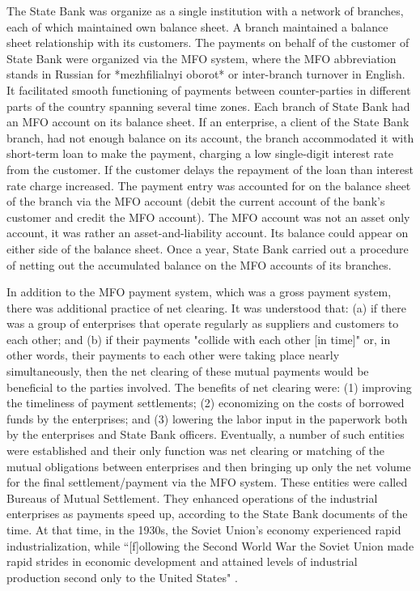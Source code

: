 The State Bank was organize as a single institution with a network of
branches, each of which maintained own balance sheet. A branch
maintained a balance sheet relationship with its customers. The payments
on behalf of the customer of State Bank were organized via the MFO
system, where the MFO abbreviation stands in Russian for *mezhfilialnyi
oborot* or inter-branch turnover in English. It facilitated smooth
functioning of payments between counter-parties in different parts of
the country spanning several time zones. Each branch of State Bank had
an MFO account on its balance sheet. If an enterprise, a client of the
State Bank branch, had not enough balance on its account, the branch
accommodated it with short-term loan to make the payment, charging a low
single-digit interest rate from the customer. If the customer delays the
repayment of the loan than interest rate charge increased. The payment
entry was accounted for on the balance sheet of the branch via the MFO
account (debit the current account of the bank's customer and credit the
MFO account). The MFO account was not an asset only account, it was
rather an asset-and-liability account. Its balance could appear on
either side of the balance sheet. Once a year, State Bank carried out a
procedure of netting out the accumulated balance on the MFO accounts of
its branches.

In addition to the MFO payment system, which was a gross payment system,
there was additional practice of net clearing. It was understood that:
(a) if there was a group of enterprises that operate regularly as
suppliers and customers to each other; and (b) if their payments
"collide with each other [in time]" or, in other words, their payments
to each other were taking place nearly simultaneously, then the net
clearing of these mutual payments would be beneficial to the parties
involved. The benefits of net clearing were: (1) improving the
timeliness of payment settlements; (2) economizing on the costs of
borrowed funds by the enterprises; and (3) lowering the labor input in
the paperwork both by the enterprises and State Bank officers.
Eventually, a number of such entities were established and their only
function was net clearing or matching of the mutual obligations between
enterprises and then bringing up only the net volume for the final
settlement/payment via the MFO system. These entities were called
Bureaus of Mutual Settlement. They enhanced operations of the industrial
enterprises as payments speed up, according to the State Bank documents
of the time. At that time, in the 1930s, the Soviet Union's economy
experienced rapid industrialization, while ``[f]ollowing the Second World
War the Soviet Union made rapid strides in economic development and
attained levels of industrial production second only to the United
States" \citep[p.~612]{dillard1967}.

